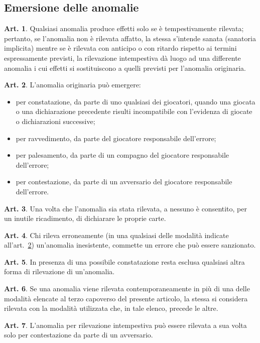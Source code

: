 \documentclass[italian,a4paper]{book}
\theoremstyle{definition}
\newtheorem{art}{Art.}
\newenvironment{packeditem}{
\begin{itemize}
  \setlength{\itemsep}{1pt}
  \setlength{\parskip}{0pt}
  \setlength{\parsep}{0pt}
}{\end{itemize}}
\begin{document}
\subsection{Emersione delle anomalie}
\begin{art}
    Qualsiasi anomalia produce effetti solo se è tempestivamente rilevata; pertanto, se l'anomalia non è rilevata affatto, la stessa s'intende sanata (sanatoria implicita) mentre se è rilevata con anticipo o con ritardo rispetto ai termini espressamente previsti, la rilevazione intempestiva dà luogo ad una differente anomalia i cui effetti si sostituiscono a quelli previsti per l'anomalia originaria.
\end{art}
\begin{art}\label{emersione.anomalie}
    L'anomalia originaria può emergere:
    \begin{packeditem}
\item  per constatazione, da parte di uno qualsiasi dei giocatori, quando una giocata o una dichiarazione precedente risulti incompatibile con l'evidenza di giocate o dichiarazioni successive;
\item  per ravvedimento, da parte del giocatore responsabile dell'errore;
\item  per palesamento, da parte di un compagno del giocatore responsabile dell'errore;
\item  per contestazione, da parte di un avversario del giocatore responsabile dell'errore.
    \end{packeditem}
\end{art}
\begin{art}
    Una volta che l'anomalia sia stata rilevata, a nessuno è consentito, per un inutile ricadimento, di dichiarare le proprie carte.
\end{art}
\begin{art}
    Chi rileva erroneamente (in una qualsiasi delle modalità indicate
    all'art.~\ref{emersione.anomalie}) un'anomalia inesistente, commette un errore che può essere sanzionato.
\end{art}
\begin{art}
    In presenza di una possibile constatazione resta esclusa qualsiasi altra forma di rilevazione di un'anomalia.
\end{art}
\begin{art}
    Se una anomalia viene rilevata contemporaneamente in più di una delle modalità elencate al terzo capoverso del presente articolo, la stessa si considera rilevata con la modalità utilizzata che, in tale elenco, precede le altre.
\end{art}
\begin{art}
    L'anomalia per rilevazione intempestiva può essere rilevata a sua volta solo per contestazione da parte di un avversario.
\end{art}
\end{document}

